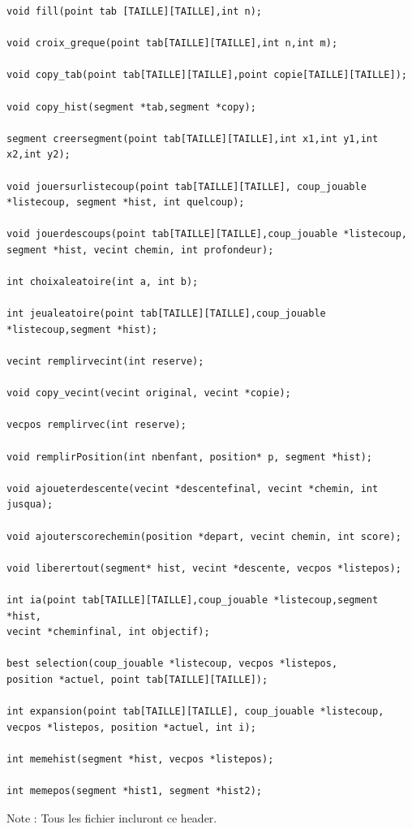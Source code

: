 \documentclass[11pt]{article}
\begin{document}
\begin{verbatim}
void fill(point tab [TAILLE][TAILLE],int n);

void croix_greque(point tab[TAILLE][TAILLE],int n,int m);

void copy_tab(point tab[TAILLE][TAILLE],point copie[TAILLE][TAILLE]);

void copy_hist(segment *tab,segment *copy);

segment creersegment(point tab[TAILLE][TAILLE],int x1,int y1,int x2,int y2);

void jouersurlistecoup(point tab[TAILLE][TAILLE], coup_jouable
*listecoup, segment *hist, int quelcoup);

void jouerdescoups(point tab[TAILLE][TAILLE],coup_jouable *listecoup,
segment *hist, vecint chemin, int profondeur);

int choixaleatoire(int a, int b);

int jeualeatoire(point tab[TAILLE][TAILLE],coup_jouable *listecoup,segment *hist);

vecint remplirvecint(int reserve);

void copy_vecint(vecint original, vecint *copie);

vecpos remplirvec(int reserve);

void remplirPosition(int nbenfant, position* p, segment *hist);

void ajoueterdescente(vecint *descentefinal, vecint *chemin, int jusqua);

void ajouterscorechemin(position *depart, vecint chemin, int score);

void liberertout(segment* hist, vecint *descente, vecpos *listepos);

int ia(point tab[TAILLE][TAILLE],coup_jouable *listecoup,segment *hist,
vecint *cheminfinal, int objectif);

best selection(coup_jouable *listecoup, vecpos *listepos,
position *actuel, point tab[TAILLE][TAILLE]);

int expansion(point tab[TAILLE][TAILLE], coup_jouable *listecoup,
vecpos *listepos, position *actuel, int i);

int memehist(segment *hist, vecpos *listepos);

int memepos(segment *hist1, segment *hist2);

\end{verbatim}
Note : Tous les fichier incluront ce header.\\
\end{document}

